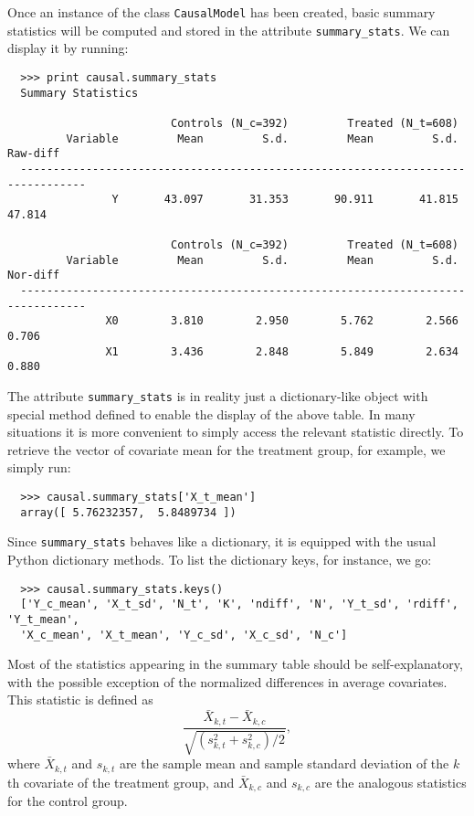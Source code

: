 \documentclass[12pt]{article}
\theoremstyle{definition}
\theoremstyle{definition}
\theoremstyle{definition}
\theoremstyle{remark}
\begin{document}
Once an instance of the class \texttt{CausalModel} has been created, basic summary statistics will be computed and stored in the attribute \texttt{summary\_stats}. We can display it by running:
\begin{verbatim}
  >>> print causal.summary_stats
  Summary Statistics
  
                         Controls (N_c=392)         Treated (N_t=608)             
         Variable         Mean         S.d.         Mean         S.d.     Raw-diff
  --------------------------------------------------------------------------------
                Y       43.097       31.353       90.911       41.815       47.814
  
                         Controls (N_c=392)         Treated (N_t=608)             
         Variable         Mean         S.d.         Mean         S.d.     Nor-diff
  --------------------------------------------------------------------------------
               X0        3.810        2.950        5.762        2.566        0.706
               X1        3.436        2.848        5.849        2.634        0.880
\end{verbatim}

The attribute \texttt{summary\_stats} is in reality just a dictionary-like object with special method defined to enable the display of the above table. In many situations it is more convenient to simply access the relevant statistic directly. To retrieve the vector of covariate mean for the treatment group, for example, we simply run:
\begin{verbatim}
  >>> causal.summary_stats['X_t_mean']
  array([ 5.76232357,  5.8489734 ])
\end{verbatim}

Since \texttt{summary\_stats} behaves like a dictionary, it is equipped with the usual Python dictionary methods. To list the dictionary keys, for instance, we go:
\begin{verbatim}
  >>> causal.summary_stats.keys()
  ['Y_c_mean', 'X_t_sd', 'N_t', 'K', 'ndiff', 'N', 'Y_t_sd', 'rdiff', 'Y_t_mean',
  'X_c_mean', 'X_t_mean', 'Y_c_sd', 'X_c_sd', 'N_c']
\end{verbatim}

Most of the statistics appearing in the summary table should be self-explanatory, with the possible exception of the normalized differences in average covariates. This statistic is defined as
\[\frac{\bar{X}_{k,t} - \bar{X}_{k,c}}{\sqrt{\left(s^2_{k,t}+s^2_{k,c}\right)\Big/ 2}},\]
where $\bar{X}_{k,t}$ and $s_{k,t}$ are the sample mean and sample standard deviation of the $k$th covariate of the treatment group, and $\bar{X}_{k,c}$ and $s_{k,c}$ are the analogous statistics for the control group.
\end{document}
